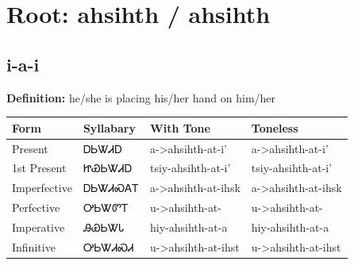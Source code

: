 \documentclass{article}%
\begin{document}
%
\normalsize%
\section*{Root: ahsihth / ahsihth}%
\subsection*{i-a-i}%
\textbf{Definition: }%
he/she is placing his/her hand on him/her%
\\[0.5em]%
\begin{tabular}{|l|l|l|l|}%
\hline%
\textbf{Form}&\textbf{Syllabary}&\textbf{With Tone}&\textbf{Toneless}\\%
\hline%
Present&ᎠᏏᏔᏗᎠ&a{-}>ahsihth{-}at{-}i'&a{-}>ahsihth{-}at{-}i'\\%
1st Present&ᏥᏯᏏᏔᏗᎠ&tsiy{-}ahsihth{-}at{-}i'&tsiy{-}ahsihth{-}at{-}i'\\%
Imperfective&ᎠᏏᏔᏗᏍᎪᎢ&a{-}>ahsihth{-}at{-}ihsk&a{-}>ahsihth{-}at{-}ihsk\\%
Perfective&ᎤᏏᏔᏛᎢ&u{-}>ahsihth{-}at{-}&u{-}>ahsihth{-}at{-}\\%
Imperative&ᎯᏯᏏᏔᏓ&hiy{-}ahsihth{-}at{-}a&hiy{-}ahsihth{-}at{-}a\\%
Infinitive&ᎤᏏᏔᏗᏍᏗ&u{-}>ahsihth{-}at{-}ihst&u{-}>ahsihth{-}at{-}ihst\\%
\hline%
\end{tabular}%
\\[1em]%
\end{document}
